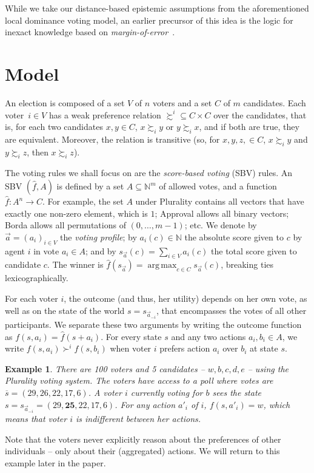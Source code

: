 \documentclass[letterpaper]{article} %
\DeclareMathOperator*{\argmax}{arg\,max}
\def\ol{\overline}
\newtheorem{example}[theorem]{Example}
\begin{document}
While we take our distance-based epistemic assumptions from the aforementioned local dominance voting model, an earlier precursor of this idea is the logic for inexact knowledge based on \emph{margin-of-error}~\cite{williamson1992inexact}.


\section{Model}\label{sec:model}

An election is composed of a set $V$ of $n$ voters and a set $C$ of $m$ candidates. Each voter~$i\in V$ has a weak preference relation $\succsim^{i}\subseteq C\times C$ over the candidates, that is, for each two candidates $x,y\in C$, $x\succsim_{i}y$ or $y\succsim_{i}x$, and if both are true, they are equivalent. Moreover, the relation is transitive (so, for $x,y,z,\in C$, $x\succsim_{i}y$ and $y\succsim_{i}z$, then $x\succsim_{i}z$). 

The voting rules we shall focus on are the \emph{score-based voting} (SBV) rules. An SBV $(\hat f,A)$ is defined by a set $A\subseteq \mathbb N^m$ of allowed votes, and a function $\hat f:A^{n}\rightarrow C$. For example, the set $A$ under Plurality contains all vectors that have exactly one non-zero element, which is $1$; Approval allows all binary vectors; Borda allows all permutations of $(0,\ldots,m-1)$; etc. We denote by $\vec a = (a_i)_{i\in V}$ the \emph{voting profile}; by $a_i(c)\in \mathbb N$ the absolute score given to $c$ by agent $i$ in vote $a_i\in A$; and by $s_{\vec a}(c)=\sum_{i\in V}a_i(c)$ the total score given to candidate $c$. The winner is $\hat f(s_{\vec a})=\argmax_{c\in C}s_{\vec a}(c)$, breaking ties lexicographically.

For each voter $i$, the outcome (and thus, her utility) depends on her own vote, as well as on the state of the world $s=s_{\vec a_{-i}}$, that encompasses the votes of all other participants. We separate these two arguments by writing the outcome function as $f(s,a_i) = \hat f(s+a_i)$. For every state $s$ and any two actions $a_i,b_i\in A$, we write $f(s,a_i) \succ^i f(s,b_i)$ when voter $i$ prefers action $a_i$ over $b_i$ at state $s$.

\begin{example}\label{ex:simple}
There are 100 voters and 5 candidates -- $w,b,c,d,e$ -- using the Plurality voting system. The voters have access to a poll where votes are $\ol s = (29,26,22,17,6)$.
 A voter $i$ currently voting for $b$ sees the state $s=s_{\vec a_{-i}} =(29,\mathbf{25},22,17,6)$. For any action $a'_i$ of $i$, $f(s,a'_i)= w$, which means that voter $i$ is indifferent between her actions. 
\end{example}
 Note that the voters never explicitly reason about the preferences of other individuals -- only about their (aggregated) actions.
 We will return to this example later in the paper. 
\end{document}

